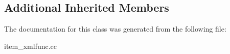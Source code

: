 \subsection*{Additional Inherited Members}


The documentation for this class was generated from the following file\+:\begin{DoxyCompactItemize}
\item 
item\+\_\+xmlfunc.\+cc\end{DoxyCompactItemize}
